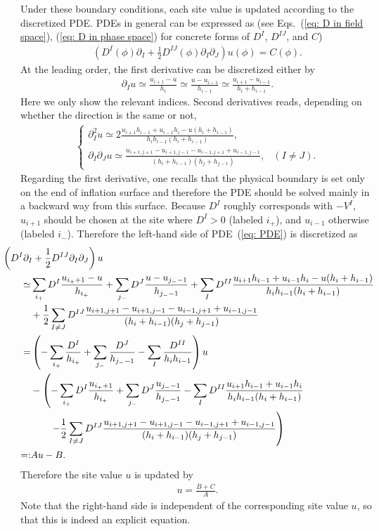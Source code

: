 \documentclass[aps, prd
, preprint
, nofootinbib 
, notitlepage
, superscriptaddress
, longbibliography
]{revtex4-1}
\newcommand{\dps}{\displaystyle}
\newcommand{\bae}[1]{\begin{align} #1 \end{align}}
\begin{document}
Under these boundary conditions, each site value is updated according to the discretized PDE.
PDEs in general can be expressed as (see Eqs.~(\ref{eq: D in field space}), (\ref{eq: D in phase space}) for concrete forms of $D^I$, $D^{IJ}$, and $C$)
\bae{\label{eq: PDE}
    \left(D^I(\phi)\partial_I+\frac{1}{2}D^{IJ}(\phi)\partial_I\partial_J\right)u(\phi)=C(\phi).
}
At the leading order, the first derivative can be discretized either by
\bae{\label{eq: discretization first der}
    \partial_Iu\simeq\frac{u_{i+1}-u}{h_i}\simeq\frac{u-u_{i-1}}{h_{i-1}}\simeq\frac{u_{i+1}-u_{i-1}}{h_i+h_{i-1}}.
}
Here we only show the relevant indices.
Second derivatives reads, depending on whether the direction is the same or not,
\bae{
    \begin{cases}
        \dps
        \partial_I^2u\simeq2\frac{u_{i+1}h_{i-1}+u_{i-1}h_i-u(h_i+h_{i-1})}{h_ih_{i-1}(h_i+h_{i-1})}, \\[10pt]
        \dps
        \partial_I\partial_Ju\simeq\frac{u_{i+1,j+1}-u_{i+1,j-1}-u_{i-1,j+1}+u_{i-1,j-1}}{(h_i+h_{i-1})(h_j+h_{j-1})}, & (I\neq J).
    \end{cases}
}
Regarding the first derivative, one recalls that the physical boundary is set only on the end of inflation surface and therefore the PDE should be solved mainly in a backward way from this surface.
Because $D^I$ roughly corresponds with $-V^I$, $u_{i+1}$ should be chosen at the site where $D^I>0$ (labeled $i_+$), and $u_{i-1}$ otherwise (labeled $i_-$).
Therefore the left-hand side of PDE~(\ref{eq: PDE}) is discretized as
\bae{
    &\hspace{-30pt}\left(D^I\partial_I+\frac{1}{2}D^{IJ}\partial_I\partial_J\right)u \nonumber \\
    \simeq&\sum_{i_+}D^I\frac{u_{i_++1}-u}{h_{i_+}}+\sum_{j_-}D^J\frac{u-u_{j_--1}}{h_{j_--1}}
    +\sum_ID^{II}\frac{u_{i+1}h_{i-1}+u_{i-1}h_i-u(h_i+h_{i-1})}{h_ih_{i-1}(h_i+h_{i-1})} \nonumber \\
    &+\frac{1}{2}\sum_{I\neq J}D^{IJ}\frac{u_{i+1,j+1}-u_{i+1,j-1}-u_{i-1,j+1}+u_{i-1,j-1}}{(h_i+h_{i-1})(h_j+h_{j-1})} \nonumber \\
    =&\left(-\sum_{i_+}\frac{D^I}{h_{i_+}}+\sum_{j_-}\frac{D^J}{h_{j_--1}}-\sum_I\frac{D^{II}}{h_ih_{i-1}}\right)u
    \nonumber \\
    &-\left(-\sum_{i_+}D^I\frac{u_{i_++1}}{h_{i_+}}+\sum_{j_-}D^J\frac{u_{j_--1}}{h_{j_--1}}-\sum_ID^{II}\frac{u_{i+1}h_{i-1}+u_{i-1}h_i}{h_ih_{i-1}(h_i+h_{i-1})} \right. \nonumber \\
    &\qquad\left.-\frac{1}{2}\sum_{I\neq J}D^{IJ}\frac{u_{i+1,j+1}-u_{i+1,j-1}-u_{i-1,j+1}+u_{i-1,j-1}}{(h_i+h_{i-1})(h_j+h_{j-1})}\right) \nonumber \\
    =:&Au-B.
}
Therefore the site value $u$ is updated by 
\bae{
    u=\frac{B+C}{A}.
}
Note that the right-hand side is independent of the corresponding site value $u$, so that this is indeed an explicit equation. 
\end{document}
